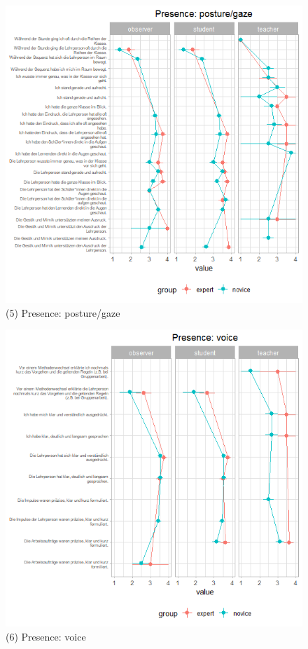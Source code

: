 \documentclass[
  english,
  man,floatsintext]{apa6}
\begin{document}
\begin{figure}

{\centering \includegraphics{./pictures/presenceposturegaze} 

}

\caption{(5) Presence: posture/gaze}\label{fig:presenceposturegaze}
\end{figure}

\newpage



\begin{figure}

{\centering \includegraphics{./pictures/presencevoice} 

}

\caption{(6) Presence: voice}\label{fig:presencevoice}
\end{figure}
\newpage
\end{document}
